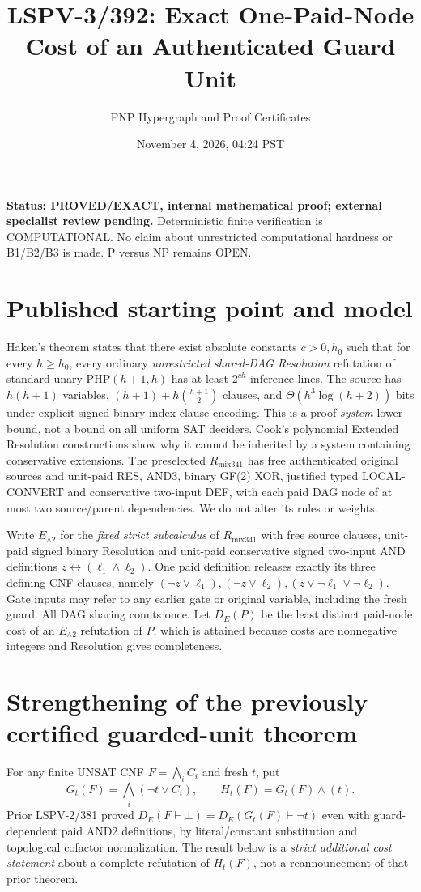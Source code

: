 \documentclass[11pt]{article}
\title{LSPV-3/392: Exact One-Paid-Node Cost of an Authenticated Guard Unit}
\author{PNP Hypergraph and Proof Certificates}
\date{November 4, 2026, 04:24 PST}
\begin{document}
\maketitle
\noindent\textbf{Status: PROVED/EXACT, internal mathematical proof; external specialist review pending.} Deterministic finite verification is COMPUTATIONAL. No claim about unrestricted computational hardness or B1/B2/B3 is made. P versus NP remains OPEN.

\section*{Published starting point and model}
Haken's theorem states that there exist absolute constants \(c>0,h_0\) such that for every \(h\ge h_0\), every ordinary \emph{unrestricted shared-DAG Resolution} refutation of standard unary \(\mathrm{PHP}(h+1,h)\) has at least \(2^{ch}\) inference lines. The source has \(h(h+1)\) variables, \((h+1)+h\binom{h+1}{2}\) clauses, and \(\Theta(h^3\log(h+2))\) bits under explicit signed binary-index clause encoding. This is a proof-\emph{system} lower bound, not a bound on all uniform SAT deciders. Cook's polynomial Extended Resolution constructions show why it cannot be inherited by a system containing conservative extensions. The preselected \(R_{\mathrm{mix341}}\) has free authenticated original sources and unit-paid RES, AND3, binary GF(2) XOR, justified typed LOCAL-CONVERT and conservative two-input DEF, with each paid DAG node of at most two source/parent dependencies. We do not alter its rules or weights.

Write \(E_{\land2}\) for the \emph{fixed strict subcalculus} of \(R_{\mathrm{mix341}}\) with free source clauses, unit-paid signed binary Resolution and unit-paid conservative signed two-input AND definitions \(z\leftrightarrow(\ell_1\land\ell_2)\). One paid definition releases exactly its three defining CNF clauses, namely \((\neg z\vee\ell_1),(\neg z\vee\ell_2),(z\vee\neg\ell_1\vee\neg\ell_2)\). Gate inputs may refer to any earlier gate or original variable, including the fresh guard. All DAG sharing counts once. Let \(D_E(P)\) be the least distinct paid-node cost of an \(E_{\land2}\) refutation of \(P\), which is attained because costs are nonnegative integers and Resolution gives completeness.

\section*{Strengthening of the previously certified guarded-unit theorem}
For any finite UNSAT CNF \(F=\bigwedge_i C_i\) and fresh \(t\), put
\[
G_t(F)=\bigwedge_i(\neg t\vee C_i),\qquad H_t(F)=G_t(F)\wedge(t).
\]
Prior LSPV-2/381 proved \(D_E(F\vdash\bot)=D_E(G_t(F)\vdash\neg t)\) even with guard-dependent paid AND2 definitions, by literal/constant substitution and topological cofactor normalization. The result below is a \emph{strict additional cost statement} about a complete refutation of \(H_t(F)\), not a reannouncement of that prior theorem.
\end{document}
